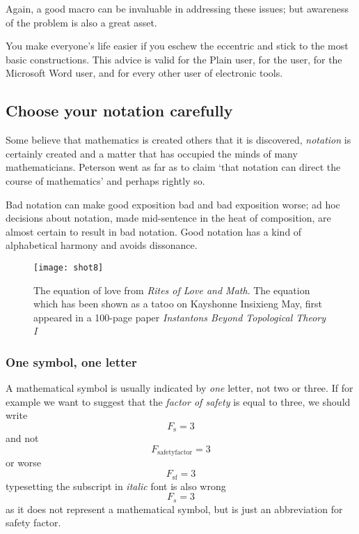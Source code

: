 {Again, a good macro can be invaluable in addressing these issues; but
awareness of the problem is also a great asset.

\begin{latexquotation}
You make everyone's
life easier if you eschew the eccentric and stick to the most basic constructions. This advice is valid for the Plain \tex user, for the \latex
user, for the Microsoft Word user, and for every other user of electronic
tools.
\end{latexquotation}



\subsection{Choose your notation carefully}

Some believe that mathematics is created others that it is discovered, \emph{notation} is certainly created and
a matter that has occupied the minds of many mathematicians. Peterson \citeyearpar{peterson2009}  went as far as to claim  `that notation can direct the course of mathematics’ and perhaps rightly so.

Bad notation can make good exposition bad and bad exposition worse; ad hoc decisions about notation, made mid-sentence in the heat of composition, are almost certain to result in bad notation. Good notation has a kind of alphabetical harmony and avoids dissonance.

\begin{figure}[htbp]
\texttt{[image: shot8]}
\caption{The equation of love from \emph{Rites of Love and Math}. The equation which has been shown as a tatoo  on Kayshonne Insixieng May, first appeared in a 100-page paper \emph{Instantons Beyond Topological Theory I} \cite{frenkel2012,FLN}}
\end{figure}


\subsubsection{One symbol, one letter}

A mathematical symbol is usually indicated by \emph{one} letter, not two or three. If for example we want to suggest that the \textit{factor of safety} is equal to three, we should write
\[F_{\mathrm{s}}=3\]
and not
\[F_{\mathrm{safetyfactor}}=3\]
or worse
\[F_{\mathrm{sf}}=3\]
typesetting the subscript in \textit{italic} font is also wrong
\[F_{s}=3\]
as it does not represent a mathematical symbol, but is just an abbreviation for safety factor.

}
